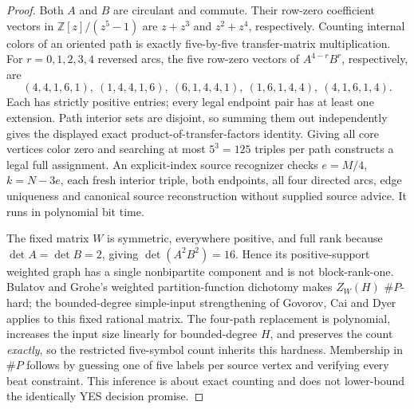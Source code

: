 \documentclass[11pt]{article}
\begin{document}
\begin{proof}
Both \(A\) and \(B\) are circulant and commute. Their row-zero
coefficient vectors in \(\mathbb Z[z]/(z^5-1)\) are
\(z+z^3\) and \(z^2+z^4\), respectively. Counting internal
colors of an oriented path is exactly five-by-five transfer-matrix
multiplication. For \(r=0,1,2,3,4\) reversed arcs, the five
row-zero vectors of \(A^{4-r}B^r\), respectively, are
\[
(4,4,1,6,1),\ (1,4,4,1,6),\ (6,1,4,4,1),\
(1,6,1,4,4),\ (4,1,6,1,4).
\]
Each has strictly positive entries; every legal endpoint pair has
at least one extension. Path interior sets are disjoint, so
summing them out independently gives the displayed exact
product-of-transfer-factors identity. Giving all core vertices
color zero and searching at most \(5^3=125\) triples per path
constructs a legal full assignment. An explicit-index source
recognizer checks \(e=M/4\), \(k=N-3e\), each fresh interior
triple, both endpoints, all four directed arcs, edge uniqueness
and canonical source reconstruction without supplied source advice.
It runs in polynomial bit time.

The fixed matrix \(W\) is symmetric, everywhere positive,
and full rank because \(\det A=\det B=2\), giving
\(\det(A^2B^2)=16\). Hence its positive-support weighted
graph has a single nonbipartite component and is not
block-rank-one. Bulatov and Grohe's weighted partition-function
dichotomy makes \(Z_W(H)\) \(\#P\)-hard; the bounded-degree
simple-input strengthening of Govorov, Cai and Dyer applies
to this fixed rational matrix. The four-path replacement is
polynomial, increases the input size linearly for bounded-degree
\(H\), and preserves the count \emph{exactly}, so the restricted
five-symbol count inherits this hardness. Membership in
\(\#P\) follows by guessing one of five labels per source
vertex and verifying every beat constraint. This inference is
about exact counting and does not lower-bound the identically
YES decision promise.
\end{proof}
\end{document}
